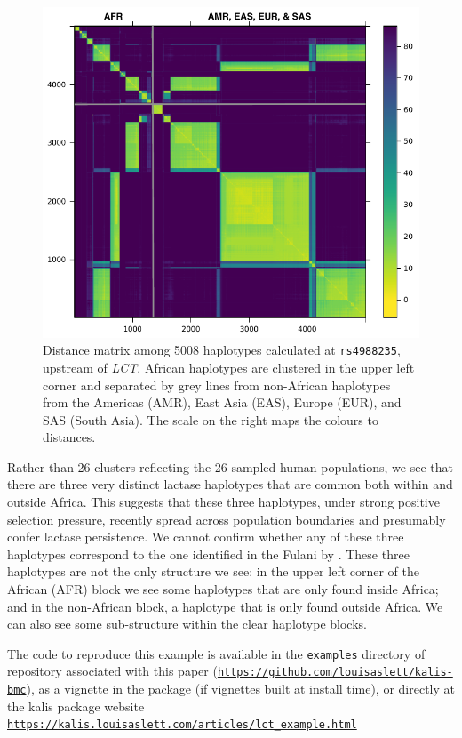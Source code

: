 \documentclass[pdflatex,referee,lineno,sn-nature]{sn-jnl}%
\newcommand{\pkg}[1]{{\fontseries{m}\fontseries{b}\selectfont #1}}
\begin{document}
\begin{figure}
  \centering
  \includegraphics{fig5}
	\caption{
	  Distance matrix among 5008 haplotypes calculated at \texttt{rs4988235}, upstream of \emph{LCT}.
	  African haplotypes are clustered in the upper left corner and separated by grey lines from non-African haplotypes from the Americas (AMR), East Asia (EAS), Europe (EUR), and SAS (South Asia).
	  The scale on the right maps the colours to distances.
	}
	\label{fig:lct}
\end{figure}

Rather than 26 clusters reflecting the 26 sampled human populations, we see that there are three very distinct lactase haplotypes that are common both within and outside Africa.
This suggests that these three haplotypes, under strong positive selection pressure, recently spread across population boundaries and presumably confer lactase persistence.
We cannot confirm whether any of these three haplotypes correspond to the one identified in the Fulani by \cite{busby2017inferring}.
These three haplotypes are not the only structure we see: in the upper left corner of the African (AFR) block we see some haplotypes that are only found inside Africa; and in the non-African block, a haplotype that is only found outside Africa.
We can also see some sub-structure within the clear haplotype blocks.

The code to reproduce this example is available in the \texttt{examples} directory of repository associated with this paper (\href{https://github.com/louisaslett/kalis-bmc}{\texttt{https://github.com/louisaslett/kalis-bmc}}), as a vignette in the package (if vignettes built at install time), or directly at the \pkg{kalis} package website \href{https://kalis.louisaslett.com/articles/lct_example.html}{\texttt{https://kalis.louisaslett.com/articles/lct\_example.html}}
\end{document}
